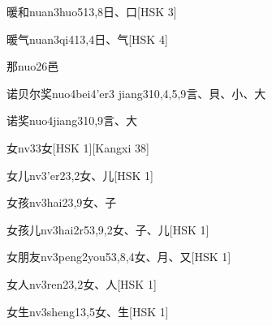 \begin{entry}{暖和}{nuan3huo5}{13,8}{⽇、⼝}[HSK 3]
\end{entry}

\begin{entry}{暖气}{nuan3qi4}{13,4}{⽇、⽓}[HSK 4]
\end{entry}

\begin{entry}{那}{nuo2}{6}{⾢}
\end{entry}

\begin{entry}{诺贝尔奖}{nuo4bei4'er3 jiang3}{10,4,5,9}{⾔、⾙、⼩、⼤}
\end{entry}

\begin{entry}{诺奖}{nuo4jiang3}{10,9}{⾔、⼤}
\end{entry}

\begin{entry}{女}{nv3}{3}{⼥}[HSK 1][Kangxi 38]
\end{entry}

\begin{entry}{女儿}{nv3'er2}{3,2}{⼥、⼉}[HSK 1]
\end{entry}

\begin{entry}{女孩}{nv3hai2}{3,9}{⼥、⼦}
\end{entry}

\begin{entry}{女孩儿}{nv3hai2r5}{3,9,2}{⼥、⼦、⼉}[HSK 1]
\end{entry}

\begin{entry}{女朋友}{nv3peng2you5}{3,8,4}{⼥、⽉、⼜}[HSK 1]
\end{entry}

\begin{entry}{女人}{nv3ren2}{3,2}{⼥、⼈}[HSK 1]
\end{entry}

\begin{entry}{女生}{nv3sheng1}{3,5}{⼥、⽣}[HSK 1]
\end{entry}

